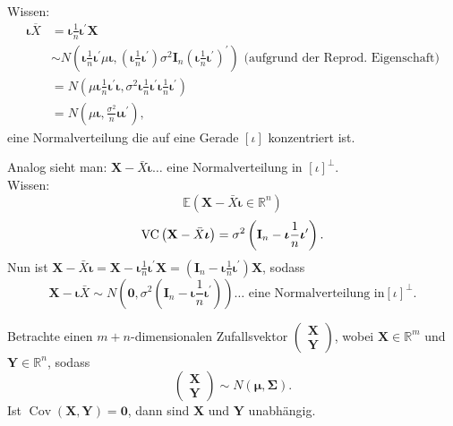 \documentclass{tstextbook}
\begin{document}
\begin{example}
	Wissen:
	\begin{align*}
		\boldsymbol{\iota}\overline{X} & =\boldsymbol{\iota}\frac{1}{n}\boldsymbol{\iota}^{\prime}\mathbf{X}\\
		& \sim N\left(\boldsymbol{\iota}\frac{1}{n}\boldsymbol{\iota}^{\prime}\mu\mathbf{\boldsymbol{\iota}},\left(\boldsymbol{\iota}\frac{1}{n}\boldsymbol{\iota}^{\prime}\right)\sigma^{2}\mathbf{I}_{n}\left(\boldsymbol{\iota}\frac{1}{n}\boldsymbol{\iota}^{\prime}\right)^{\prime}\right)\text{ (aufgrund der Reprod. Eigenschaft)}\\
		& =N\left(\mu\boldsymbol{\iota}\frac{1}{n}\boldsymbol{\iota}^{\prime}\boldsymbol{\iota},\sigma^{2}\boldsymbol{\iota}\frac{1}{n}\boldsymbol{\iota}^{\prime}\boldsymbol{\iota}\frac{1}{n}\boldsymbol{\iota}^{\prime}\right)\\
		& =N\left(\mu\boldsymbol{\iota},\frac{\sigma^{2}}{n}\boldsymbol{\iota}\boldsymbol{\iota}^{\prime}\right),
	\end{align*}
	eine Normalverteilung die auf eine Gerade $[\iota]$ konzentriert
	ist.
	
	Analog sieht man:
	$\mathbf{X}-\bar{X}\boldsymbol{\iota}\ldots$ eine Normalverteilung in $ [\iota]^\perp. $\\
	Wissen: \\
	\[ \mathbb{E}\left( \mathbf{X}-\bar{X}\boldsymbol{\iota}\in\mathbb{R}^n\right) \]
	\[ \operatorname{VC}\left(\mathbf{X}-\bar{X}\boldsymbol{\iota}\right)=\sigma^2\left(\mathbf{I}_n-\boldsymbol{\iota}\frac{1}{n}\boldsymbol{\iota}^{\prime}\right). \]
	Nun ist $ \mathbf{X}-\bar{X}\boldsymbol{\iota}=\mathbf{X}-\boldsymbol{\iota}\frac{1}{n}\boldsymbol{\iota}^{\prime}\mathbf{X}=\left(\mathbf{I}_n-\boldsymbol{\iota} \frac{1}{n}\boldsymbol{\iota}^{\prime}\right)\mathbf{X} $, sodass \[ \mathbf{X}-\boldsymbol{\iota}\bar{X}\sim N\left(\boldsymbol{0},\sigma^2\left(\mathbf{I}_n-\boldsymbol{\iota}\frac{1}{n}\boldsymbol{\iota}^{\prime}\right)\right)\ldots\text{ eine Normalverteilung in}[\iota]^{\perp}.\]
	
	\end{example}

\begin{theorem}
	
	Betrachte einen $ m+n $-dimensionalen Zufallsvektor $ \begin{pmatrix} \mathbf{X} \\ \mathbf{Y}\end{pmatrix} $, wobei $ \mathbf{X} \in \mathbb{R}^m $ und $ \mathbf{Y} \in \mathbb{R}^n $, sodass 
	\[ \begin{pmatrix}	\mathbf{X} \\ \mathbf{Y} \end{pmatrix} \sim N(\boldsymbol{\mu}, \boldsymbol{\Sigma}). \]
	Ist $ \operatorname{Cov} (\mathbf{X} , \mathbf{Y}) = \boldsymbol{0} $, dann sind $ \mathbf{X} $ und $ \mathbf{Y} $ unabhängig.
\end{theorem}
\end{document}
